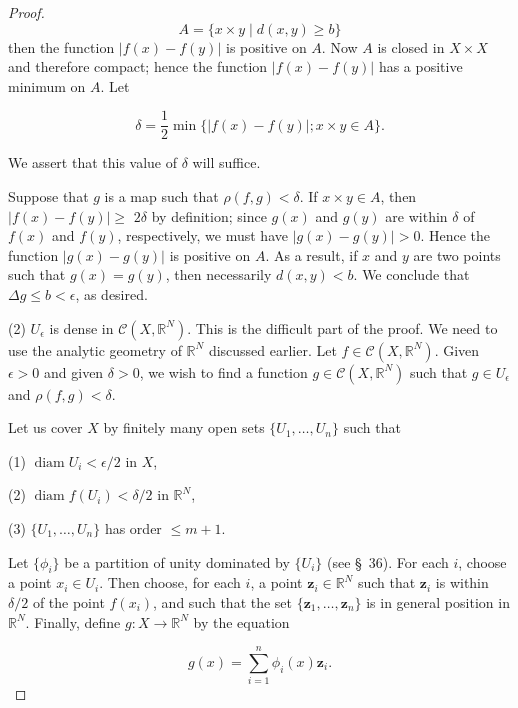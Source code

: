 \begin{proof}
\[
A = \{ x \times y \mid d({x,y}) \geq b\}
\]
then the function \(| {f(x) - f( y) }|\) is positive on \(A\). Now \(A\) is closed in \(X \times X\) and therefore compact; hence the function \(| {f(x) - f( y) }|\) has a positive minimum on \(A\). Let

\[
\delta = \frac{1}{2}\min \{ | {f(x) - f( y) }| ;x \times y \in A\}.
\]

We assert that this value of \(\delta\) will suffice.

Suppose that \(g\) is a map such that \(\rho ({f,g}) < \delta\). If \(x \times y \in A\), then \(| {f(x) - f( y) }| \geq\) \({2\delta }\) by definition; since \(g(x)\) and \(g( y)\) are within \(\delta\) of \(f(x)\) and \(f( y)\), respectively, we must have \(| {g(x) - g( y) }| > 0\). Hence the function \(| {g(x) - g( y) }|\) is positive on \(A\). As a result, if \(x\) and \(y\) are two points such that \(g(x) = g( y)\), then necessarily \(d({x,y}) < b\). We conclude that \({\Delta g} \leq b < \epsilon\), as desired.

(2) \(U_{\epsilon }\) is dense in \(\mathcal{C}({X,\mathbb{R}^{N}})\). This is the difficult part of the proof. We need to use the analytic geometry of \(\mathbb{R}^{N}\) discussed earlier. Let \(f \in \mathcal{C}({X,\mathbb{R}^{N}})\). Given \(\epsilon > 0\) and given \(\delta > 0\), we wish to find a function \(g \in \mathcal{C}({X,\mathbb{R}^{N}})\) such that \(g \in {U}_{\epsilon }\) and \(\rho ({f,g}) < \delta\).

Let us cover \(X\) by finitely many open sets \(\{ {U_{1},\ldots ,U_{n}}\}\) such that

(1) \(\operatorname{diam}U_{i} < \epsilon /2\) in \(X\),

(2) \(\operatorname{diam}f(U_{i}) < \delta /2\) in \(\mathbb{R}^{N}\),

(3) \(\{ {U_{1},\ldots ,U_{n}}\}\) has order \(\leq m + 1\).

Let \(\{ {\phi }_{i}\}\) be a partition of unity dominated by \(\{ U_{i}\}\) (see \S\ 36). For each \(i\), choose a point \(x_{i} \in {U}_{i}\). Then choose, for each \(i\), a point \(\mathbf{z}_{i} \in {\mathbb{R}}^{N}\) such that \(\mathbf{z}_{i}\) is within \(\delta /2\) of the point \(f(x_{i})\), and such that the set \(\{ {\mathbf{z}_{1},\ldots ,\mathbf{z}_{n}}\}\) is in general position in \(\mathbb{R}^{N}\). Finally, define \(g : X \rightarrow {\mathbb{R}}^{N}\) by the equation

\[
g(x) = \mathop{\sum }\limits_{{i = 1}}^{n}{\phi }_{i}(x) \mathbf{z}_{i}.
\]


\end{proof}
